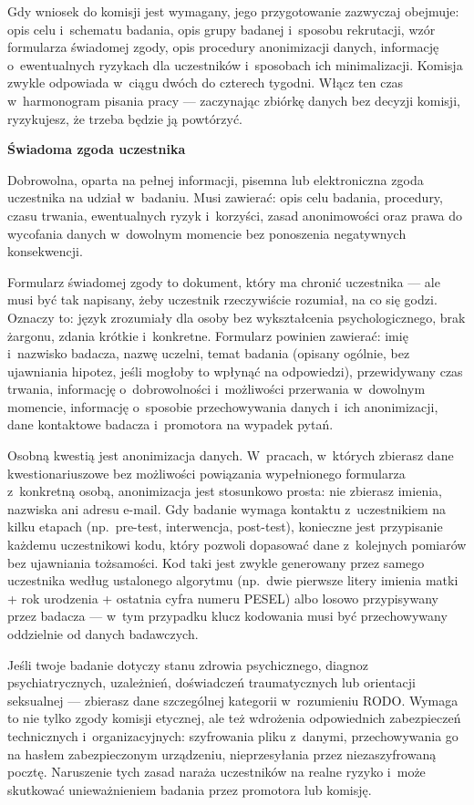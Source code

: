 \documentclass[12pt,a4paper,twoside,openany]{book}
\newcommand{\concept}[2]{%
  \par\vspace{6pt}
  \begin{tcolorbox}[enhanced, breakable, colback=accent!6, colframe=accent,
    boxrule=0pt, leftrule=3.5pt, arc=2pt, drop fuzzy shadow={black!15},
    left=10pt, right=10pt, top=7pt, bottom=7pt, before upper={\parindent0pt}]
    {\sffamily\bfseries\color{accent}#1}\par\vspace{2pt}\small #2
  \end{tcolorbox}\par
}
\begin{document}
Gdy wniosek do komisji jest wymagany, jego przygotowanie zazwyczaj obejmuje: opis celu i~schematu badania, opis grupy badanej i~sposobu rekrutacji, wzór formularza świadomej zgody, opis procedury anonimizacji danych, informację o~ewentualnych ryzykach dla uczestników i~sposobach ich minimalizacji. Komisja zwykle odpowiada w~ciągu dwóch do czterech tygodni. Włącz ten czas w~harmonogram pisania pracy --- zaczynając zbiórkę danych bez decyzji komisji, ryzykujesz, że trzeba będzie ją powtórzyć.

\concept{Świadoma zgoda uczestnika}{Dobrowolna, oparta na pełnej informacji, pisemna lub elektroniczna zgoda uczestnika na udział w~badaniu. Musi zawierać: opis celu badania, procedury, czasu trwania, ewentualnych ryzyk i~korzyści, zasad anonimowości oraz prawa do wycofania danych w~dowolnym momencie bez ponoszenia negatywnych konsekwencji.}

Formularz świadomej zgody to dokument, który ma chronić uczestnika --- ale musi być tak napisany, żeby uczestnik rzeczywiście rozumiał, na co się godzi. Oznaczy to: język zrozumiały dla osoby bez wykształcenia psychologicznego, brak żargonu, zdania krótkie i~konkretne. Formularz powinien zawierać: imię i~nazwisko badacza, nazwę uczelni, temat badania (opisany ogólnie, bez ujawniania hipotez, jeśli mogłoby to wpłynąć na odpowiedzi), przewidywany czas trwania, informację o~dobrowolności i~możliwości przerwania w~dowolnym momencie, informację o~sposobie przechowywania danych i~ich anonimizacji, dane kontaktowe badacza i~promotora na wypadek pytań.

Osobną kwestią jest anonimizacja danych. W~pracach, w~których zbierasz dane kwestionariuszowe bez możliwości powiązania wypełnionego formularza z~konkretną osobą, anonimizacja jest stosunkowo prosta: nie zbierasz imienia, nazwiska ani adresu e-mail. Gdy badanie wymaga kontaktu z~uczestnikiem na kilku etapach (np.\ pre-test, interwencja, post-test), konieczne jest przypisanie każdemu uczestnikowi kodu, który pozwoli dopasować dane z~kolejnych pomiarów bez ujawniania tożsamości. Kod taki jest zwykle generowany przez samego uczestnika według ustalonego algorytmu (np.\ dwie pierwsze litery imienia matki + rok urodzenia + ostatnia cyfra numeru PESEL) albo losowo przypisywany przez badacza --- w~tym przypadku klucz kodowania musi być przechowywany oddzielnie od danych badawczych.

\begin{warningbox}
Jeśli twoje badanie dotyczy stanu zdrowia psychicznego, diagnoz psychiatrycznych, uzależnień, doświadczeń traumatycznych lub orientacji seksualnej --- zbierasz dane szczególnej kategorii w~rozumieniu RODO. Wymaga to nie tylko zgody komisji etycznej, ale też wdrożenia odpowiednich zabezpieczeń technicznych i~organizacyjnych: szyfrowania pliku z~danymi, przechowywania go na hasłem zabezpieczonym urządzeniu, nieprzesyłania przez niezaszyfrowaną pocztę. Naruszenie tych zasad naraża uczestników na realne ryzyko i~może skutkować unieważnieniem badania przez promotora lub komisję.
\end{warningbox}
\end{document}
